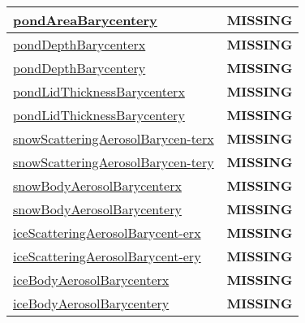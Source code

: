 {\begin{center}
\begin{longtable}{| p{2.0in} | p{4.0in} |}
    \hline
    \hyperref[subsec:var_sec_tracer_barycenter_pondAreaBarycentery]{pondAreaBarycentery} & {\bf \color{red} MISSING} \\
    \hline
    \hyperref[subsec:var_sec_tracer_barycenter_pondDepthBarycenterx]{pondDepthBarycenterx} & {\bf \color{red} MISSING} \\
    \hline
    \hyperref[subsec:var_sec_tracer_barycenter_pondDepthBarycentery]{pondDepthBarycentery} & {\bf \color{red} MISSING} \\
    \hline
    \hyperref[subsec:var_sec_tracer_barycenter_pondLidThicknessBarycenterx]{pondLidThicknessBarycenterx} & {\bf \color{red} MISSING} \\
    \hline
    \hyperref[subsec:var_sec_tracer_barycenter_pondLidThicknessBarycentery]{pondLidThicknessBarycentery} & {\bf \color{red} MISSING} \\
    \hline
    \hyperref[subsec:var_sec_tracer_barycenter_snowScatteringAerosolBarycenterx]{snowScatteringAerosolBarycen-}\hyperref[subsec:var_sec_tracer_barycenter_snowScatteringAerosolBarycenterx]{terx  }& {\bf \color{red} MISSING} \\
    \hline
    \hyperref[subsec:var_sec_tracer_barycenter_snowScatteringAerosolBarycentery]{snowScatteringAerosolBarycen-}\hyperref[subsec:var_sec_tracer_barycenter_snowScatteringAerosolBarycentery]{tery  }& {\bf \color{red} MISSING} \\
    \hline
    \hyperref[subsec:var_sec_tracer_barycenter_snowBodyAerosolBarycenterx]{snowBodyAerosolBarycenterx} & {\bf \color{red} MISSING} \\
    \hline
    \hyperref[subsec:var_sec_tracer_barycenter_snowBodyAerosolBarycentery]{snowBodyAerosolBarycentery} & {\bf \color{red} MISSING} \\
    \hline
    \hyperref[subsec:var_sec_tracer_barycenter_iceScatteringAerosolBarycenterx]{iceScatteringAerosolBarycent-}\hyperref[subsec:var_sec_tracer_barycenter_iceScatteringAerosolBarycenterx]{erx  }& {\bf \color{red} MISSING} \\
    \hline
    \hyperref[subsec:var_sec_tracer_barycenter_iceScatteringAerosolBarycentery]{iceScatteringAerosolBarycent-}\hyperref[subsec:var_sec_tracer_barycenter_iceScatteringAerosolBarycentery]{ery  }& {\bf \color{red} MISSING} \\
    \hline
    \hyperref[subsec:var_sec_tracer_barycenter_iceBodyAerosolBarycenterx]{iceBodyAerosolBarycenterx} & {\bf \color{red} MISSING} \\
    \hline
    \hyperref[subsec:var_sec_tracer_barycenter_iceBodyAerosolBarycentery]{iceBodyAerosolBarycentery} & {\bf \color{red} MISSING} \\

\end{longtable}
\end{center}}
